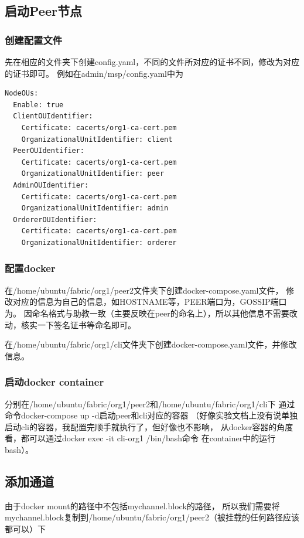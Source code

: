 \documentclass{article}
\begin{document}
    \subsection{启动Peer节点}
    \subsubsection{创建配置文件}
    先在相应的文件夹下创建{\jetbrains config.yaml}，不同的文件所对应的证书不同，修改为对应的证书即可。
    例如在{\jetbrains admin/msp/config.yaml}中为
    \begin{lstlisting}[]
NodeOUs:
  Enable: true
  ClientOUIdentifier:
    Certificate: cacerts/org1-ca-cert.pem
    OrganizationalUnitIdentifier: client
  PeerOUIdentifier:
    Certificate: cacerts/org1-ca-cert.pem
    OrganizationalUnitIdentifier: peer
  AdminOUIdentifier:
    Certificate: cacerts/org1-ca-cert.pem
    OrganizationalUnitIdentifier: admin
  OrdererOUIdentifier:
    Certificate: cacerts/org1-ca-cert.pem
    OrganizationalUnitIdentifier: orderer
    \end{lstlisting}
    \subsubsection{配置docker}
    在{\jetbrains /home/ubuntu/fabric/org1/peer2}文件夹下创建{\jetbrains docker-compose.yaml}文件，
    修改对应的信息为自己的信息，如{\jetbrains HOSTNAME}等，PEER端口为{}，GOSSIP端口为{}。
    因命名格式与助教一致（主要反映在peer的命名上），所以其他信息不需要改动，核实一下签名证书等命名即可。

    在{\jetbrains /home/ubuntu/fabric/org1/cli}文件夹下创建{\jetbrains docker-compose.yaml}文件，并修改信息。
    \subsubsection{启动docker container}
    分别在{\jetbrains /home/ubuntu/fabric/org1/peer2}和{\jetbrains /home/ubuntu/fabric/org1/cli}下
    通过命令{\jetbrains docker-compose up -d}启动peer和cli对应的容器
    （好像实验文档上没有说单独启动cli的容器，我配置完顺手就执行了，但好像也不影响，
    从docker容器的角度看，都可以通过{\jetbrains docker exec -it cli-org1 /bin/bash}命令
    在container中的运行bash）。
    \subsection{添加通道}
    由于{\jetbrains docker mount}的路径中不包括{\jetbrains mychannel.block}的路径，
    所以我们需要将{\jetbrains mychannel.block}复制到{\jetbrains /home/ubuntu/fabric/org1/peer2}（被挂载的任何路径应该都可以）下
\end{document}
